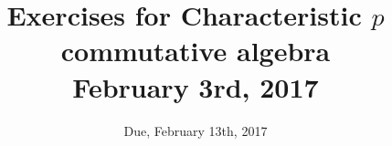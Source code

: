 \documentclass[12pt]{amsart}
\numberwithin{equation}{theorem}
\renewcommand{\:}{\colon}
\theoremstyle{theorem}
\begin{document}
\title{Exercises for Characteristic $p$ commutative algebra\\February 3rd, 2017}
\author{Due, February 13th, 2017}



\maketitle

%
%
\end{document}
